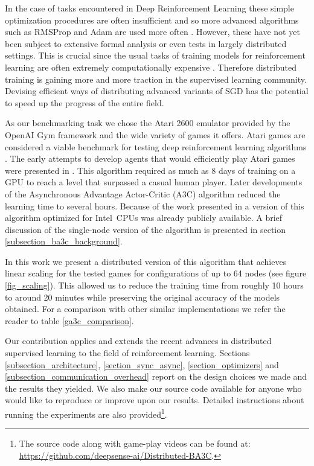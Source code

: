 \documentclass{llncs}
\begin{document}
In the case of tasks encountered in Deep Reinforcement Learning these simple optimization procedures are often insufficient and so more advanced algorithms such as RMSProp \cite{rmsprop_paper} and Adam \cite{adam_paper} are used more often \cite{deepmind_nature,deepmind_a3c,ga3c_2017,ba3c_paper,ppo}. However, these have not yet been subject to extensive formal analysis or even tests in largely distributed settings. This is crucial since the usual tasks of training models for reinforcement learning are often extremely computationally expensive \cite{deepmind_nature}. Therefore distributed training is gaining more and more traction in the supervised learning community. Devising efficient ways of distributing advanced variants of SGD has the potential to speed up the progress of the entire field. 

As our benchmarking task we chose the Atari 2600 emulator \cite{ALE} provided by the OpenAI Gym framework \cite{openai_gym} and the wide variety of games it offers. Atari games are considered a viable benchmark for testing deep reinforcement learning algorithms \cite{ga3c_2017,ppo,ba3c_paper}. The early attempts to develop agents that would efficiently play Atari games were presented in \cite{dqn}. This algorithm required as much as 8 days of training on a GPU \cite{deepmind_a3c} to reach a level that surpassed a casual human player. Later developments of the Asynchronous Advantage Actor-Critic (A3C) algorithm \cite{deepmind_a3c} reduced the learning time to several hours. Because of the work presented in \cite{ba3c_paper} a version of this algorithm optimized for Intel\textsuperscript{\textregistered}\ CPUs was already publicly available. A brief discussion of the single-node version of the algorithm is presented in section \ref{subsection_ba3c_background}.

In this work we present a distributed version of this algorithm that achieves linear scaling for the tested games for configurations of up to 64 nodes (see figure \ref{fig_scaling}). This allowed us to reduce the training time from roughly 10 hours to around 20 minutes while preserving the original accuracy of the models obtained. For a comparison with other similar implementations we refer the reader to table \ref{ga3c_comparison}.

Our contribution applies and extends the recent advances \cite{fair_paper,google_brain_paper} in distributed supervised learning to the field of reinforcement learning. Sections \ref{subsection_architecture}, \ref{section_sync_async}, \ref{section_optimizers} and \ref{subsection_communication_overhead} report on the design choices we made and the results they yielded. 
We also make our source code available for anyone who would like to reproduce or improve upon our results. Detailed instructions about running the experiments are also provided\footnote{The source code along with game-play videos  can be found at: \url{https://github.com/deepsense-ai/Distributed-BA3C}.}.
\end{document}
